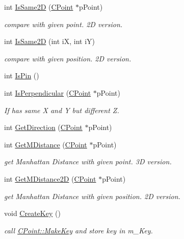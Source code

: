 \begin{DoxyCompactItemize}
int \mbox{\hyperlink{classCPoint_a723515e5fe780b2bc7c4357f210ff6ac}{Is\+Same2D}} (\mbox{\hyperlink{classCPoint}{C\+Point}} $\ast$p\+Point)
\begin{DoxyCompactList}\small\item\em compare with given point. 2D version. \end{DoxyCompactList}\item 
int \mbox{\hyperlink{classCPoint_a42c0cc1723520246e543073a13a2c45a}{Is\+Same2D}} (int iX, int iY)
\begin{DoxyCompactList}\small\item\em compare with given position. 2D version. \end{DoxyCompactList}\item 
int \mbox{\hyperlink{classCPoint_a280126da62c6a79238c2511639d58786}{Is\+Pin}} ()
\item 
int \mbox{\hyperlink{classCPoint_a9ae0796ca1d732df8bf718c07e998e41}{Is\+Perpendicular}} (\mbox{\hyperlink{classCPoint}{C\+Point}} $\ast$p\+Point)
\begin{DoxyCompactList}\small\item\em If has same X and Y but different Z. \end{DoxyCompactList}\item 
int \mbox{\hyperlink{classCPoint_add1e7b0b591f46026f281758a263da73}{Get\+Direction}} (\mbox{\hyperlink{classCPoint}{C\+Point}} $\ast$p\+Point)
\item 
int \mbox{\hyperlink{classCPoint_a46b97b169fa384088ee36894fdf4c40d}{Get\+M\+Distance}} (\mbox{\hyperlink{classCPoint}{C\+Point}} $\ast$p\+Point)
\begin{DoxyCompactList}\small\item\em get Manhattan Distance with given point. 3D version. \end{DoxyCompactList}\item 
int \mbox{\hyperlink{classCPoint_ab6f68628b53f852dc41210196464c004}{Get\+M\+Distance2D}} (\mbox{\hyperlink{classCPoint}{C\+Point}} $\ast$p\+Point)
\begin{DoxyCompactList}\small\item\em get Manhattan Distance with given position. 2D version. \end{DoxyCompactList}\item 
void \mbox{\hyperlink{classCPoint_adff246311a759e9c7eaa5f5374dd3643}{Create\+Key}} ()
\begin{DoxyCompactList}\small\item\em call \mbox{\hyperlink{classCPoint_aa93327a1be5e5d9df55f3eb9750af25d}{C\+Point\+::\+Make\+Key}} and store key in m\+\_\+\+Key. \end{DoxyCompactList}\item 

\end{DoxyCompactItemize}
